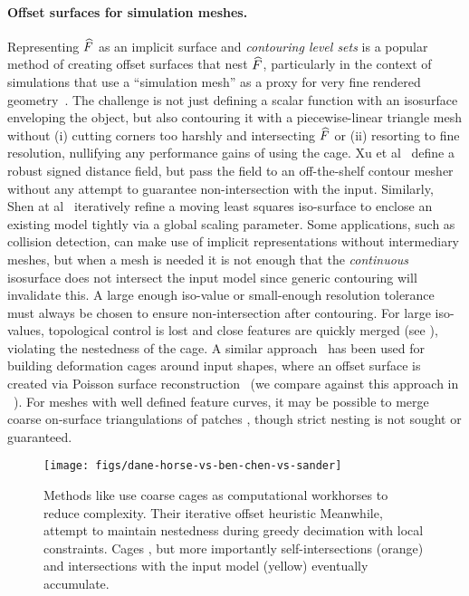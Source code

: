 \paragraph{Offset surfaces for simulation meshes.}
%
Representing $\widehat{F}$ as an implicit surface and \emph{contouring level
sets} is a popular method of creating offset surfaces that nest $\widehat{F}$,
particularly in the context of simulations that use a ``simulation mesh'' as a
proxy for very fine rendered geometry~\cite{Campen:2010}. The challenge is not
just defining a scalar function with an isosurface enveloping the object, but
also contouring it with a piecewise-linear triangle mesh without (i) cutting
corners too harshly and intersecting $\widehat{F}$ or (ii) resorting to fine
resolution, nullifying any performance gains of using the cage.
%
Xu et al~ define a robust signed distance field, but
pass the field to an off-the-shelf contour mesher without any attempt to
guarantee non-intersection with the input.  Similarly, Shen at
al~ iteratively refine a moving least squares
iso-surface to enclose an existing model tightly via a global scaling
parameter.
%
Some applications, such as collision detection, can make use of implicit
representations without intermediary meshes,
%
but when a mesh is needed it is not enough that the \emph{continuous}
isosurface does not intersect the input model since generic contouring will
invalidate this.
%
A large enough iso-value or
small-enough resolution tolerance must always be chosen to ensure
non-intersection after contouring. For large iso-values, topological control is
lost and close features are quickly merged (see ),
violating the nestedness of the cage. A similar
approach~\cite{Ben-Chen:2009:SDT} has been used for building deformation cages
around input shapes, where an offset surface is created via Poisson surface
reconstruction~\cite{PoissonSurfaceReconstruction06} (we compare against this
approach in ~). 
%
For meshes with well defined feature curves, it may be possible to merge coarse
on-surface triangulations of patches \cite{Xian:2013}, though strict nesting is
not sought or guaranteed.

\begin{figure}
  \texttt{[image: figs/dane-horse-vs-ben-chen-vs-sander]}
  \caption{Methods like \protect\cite{Ben-Chen:2009:SDT} use coarse cages as
  computational workhorses to reduce complexity. Their iterative offset
  heuristic 
  Meanwhile, \protect\cite{Sander:2000:SC} attempt to
  maintain nestedness during greedy decimation with local constraints. Cages
  , but more importantly self-intersections (orange) and
  intersections with the input model (yellow) eventually accumulate.}
  \label{fig:dane-vs-ben-chen}
  \vspace*{-5mm}
\end{figure}

